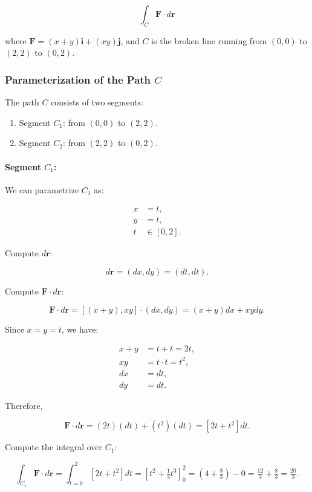 \documentclass[11pt]{article}
\begin{document}
\[
\int_{C} \mathbf{F} \cdot d\mathbf{r}
\]

where $\mathbf{F} = (x + y)\mathbf{i} + (x y)\mathbf{j}$, and $C$ is the broken line running from $(0, 0)$ to $(2, 2)$ to $(0, 2)$.

\newpage

\subsubsection{Parameterization of the Path $C$}

The path $C$ consists of two segments:

\begin{enumerate}
    \item Segment $C_1$: from $(0, 0)$ to $(2, 2)$.
    \item Segment $C_2$: from $(2, 2)$ to $(0, 2)$.
\end{enumerate}

\paragraph{Segment $C_1$:}

We can parametrize $C_1$ as:

\[
\begin{aligned}
x &= t, \\
y &= t, \\
t &\in [0, 2].
\end{aligned}
\]

Compute $d\mathbf{r}$:

\[
d\mathbf{r} = (dx, dy) = (dt, dt).
\]

Compute $\mathbf{F} \cdot d\mathbf{r}$:

\[
\mathbf{F} \cdot d\mathbf{r} = [(x + y), x y] \cdot (dx, dy) = (x + y) dx + x y dy.
\]

Since $x = y = t$, we have:

\[
\begin{aligned}
x + y &= t + t = 2t, \\
x y &= t \cdot t = t^2, \\
dx &= dt, \\
dy &= dt.
\end{aligned}
\]

Therefore,

\[
\mathbf{F} \cdot d\mathbf{r} = (2t)(dt) + (t^2)(dt) = [2t + t^2] dt.
\]

Compute the integral over $C_1$:

\[
\int_{C_1} \mathbf{F} \cdot d\mathbf{r} = \int_{t=0}^{2} [2t + t^2] dt = \left[ t^2 + \tfrac{1}{3} t^3 \right]_0^2 = \left( 4 + \tfrac{8}{3} \right) - 0 = \tfrac{12}{3} + \tfrac{8}{3} = \tfrac{20}{3}.
\]
\end{document}
